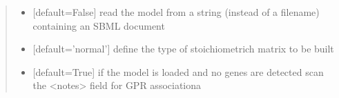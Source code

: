 \documentclass[letterpaper,12pt,english]{sphinxmanual}
\begin{document}
\begin{fulllineitems}
\begin{quote}
\begin{description}
\begin{itemize}
\item {} 
\sphinxAtStartPar
{} \textendash{} {[}default=False{]} read the model from a string (instead of a filename) containing an SBML document

\item {} 
\sphinxAtStartPar
{} \textendash{} {[}default=’normal’{]} define the type of stoichiometrich matrix to be built

\item {} 
\sphinxAtStartPar
{} \textendash{} {[}default=True{]} if the model is loaded and no genes are detected scan the \textless{}notes\textgreater{} field for GPR associationa

\end{itemize}

\end{description}\end{quote}

\end{fulllineitems}
\end{document}
